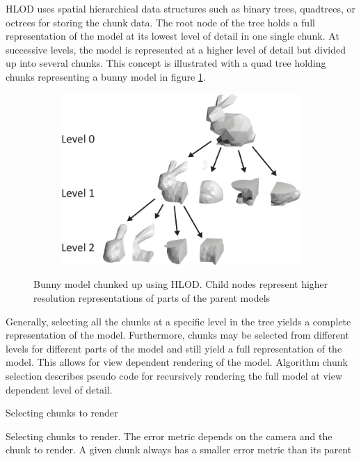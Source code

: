 HLOD uses spatial hierarchical data structures such as binary trees, quadtrees, or octrees for storing the chunk data. The root node of the tree holds a full representation of the model at its lowest level of detail in one single chunk. At successive levels, the model is represented at a higher level of detail but divided up into several chunks. This concept is illustrated with a quad tree holding chunks representing a bunny model in figure \ref{fig:hlod}.

\begin{figure}[htbp]
    \centering
    \begin{subfigure}[bt]{0.6\textwidth}
        \includegraphics[width=\textwidth]{figures/lod/hlod.pdf}
    \end{subfigure}
    \caption{Bunny model chunked up using HLOD. Child nodes represent higher resolution representations of parts of the parent models}
    \label{fig:hlod}
\end{figure}

Generally, selecting all the chunks at a specific level in the tree yields a complete representation of the model. Furthermore, chunks may be selected from different levels for different parts of the model and still yield a full representation of the model. This allows for view dependent rendering of the model. Algorithm chunk selection describes pseudo code for recursively rendering the full model at view dependent level of detail.

\begin{algorithm}[htp]
  \caption{Selecting chunks to render}
    \label{alg:chunkselection}
  \caption{Selecting chunks to render. The error metric depends on the camera and the chunk to render. A given chunk always has a smaller error metric than its parent}
\end{algorithm} 

